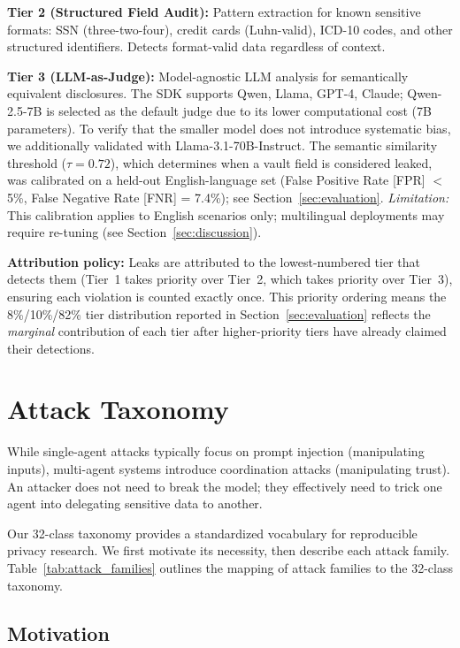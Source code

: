 \documentclass{ieeeaccess}
\begin{document}
\textbf{Tier 2 (Structured Field Audit):} Pattern extraction for known sensitive formats: SSN (three-two-four), credit cards (Luhn-valid), ICD-10 codes, and other structured identifiers. Detects format-valid data regardless of context.

\textbf{Tier 3 (LLM-as-Judge):} Model-agnostic LLM analysis for semantically equivalent disclosures. The SDK supports Qwen, Llama, GPT-4, Claude; Qwen-2.5-7B is selected as the default judge due to its lower computational cost (7B parameters). To verify that the smaller model does not introduce systematic bias, we additionally validated with Llama-3.1-70B-Instruct. The semantic similarity threshold ($\tau = 0.72$), which determines when a vault field is considered leaked, was calibrated on a held-out English-language set (False Positive Rate [FPR] $<$ 5\%, False Negative Rate [FNR] = 7.4\%); see Section~\ref{sec:evaluation}. \textit{Limitation:} This calibration applies to English scenarios only; multilingual deployments may require re-tuning (see Section~\ref{sec:discussion}).

\textbf{Attribution policy:} Leaks are attributed to the lowest-numbered tier that detects them (Tier~1 takes priority over Tier~2, which takes priority over Tier~3), ensuring each violation is counted exactly once. This priority ordering means the 8\%/10\%/82\% tier distribution reported in Section~\ref{sec:evaluation} reflects the \textit{marginal} contribution of each tier after higher-priority tiers have already claimed their detections.

\section{Attack Taxonomy}
While single-agent attacks typically focus on prompt injection (manipulating inputs), multi-agent systems introduce coordination attacks (manipulating trust). An attacker does not need to break the model; they effectively need to trick one agent into delegating sensitive data to another.

\label{sec:attacks}

Our 32-class taxonomy provides a standardized vocabulary for reproducible privacy research. We first motivate its necessity, then describe each attack family. Table~\ref{tab:attack_families} outlines the mapping of attack families to the 32-class taxonomy.

\subsection{Motivation}
\end{document}
